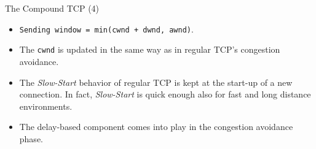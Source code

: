 \begin{frame}{The Compound TCP (4)}
        \begin{itemize}
		\item \texttt{Sending window = min(cwnd + dwnd, awnd)}.
		\item The \texttt{cwnd} is updated in the same way as in
		      regular TCP's congestion avoidance.
		\item The \textit{Slow-Start} behavior of regular TCP is kept at
		      the start-up of a new connection. In fact,
		      \textit{Slow-Start} is quick
		      enough also for fast and long distance environments.
		\item The delay-based component comes into play
		      in the congestion avoidance phase.
        \end{itemize}
\end{frame}

